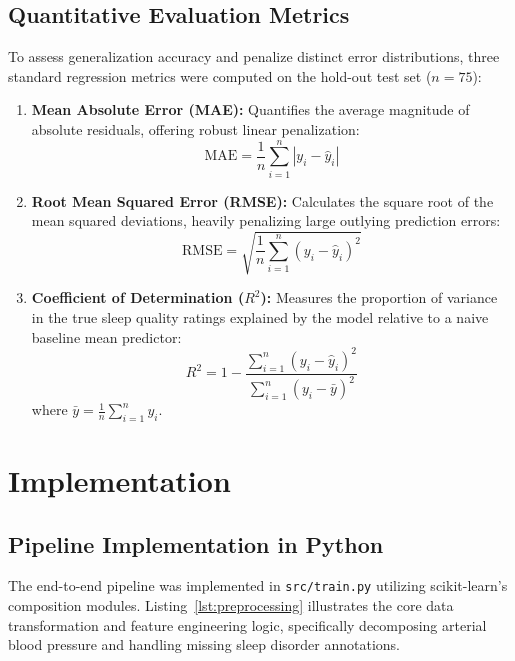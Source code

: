 \documentclass[12pt,a4paper]{article}
\begin{document}
\subsection{Quantitative Evaluation Metrics}
To assess generalization accuracy and penalize distinct error distributions, three standard regression metrics were computed on the hold-out test set ($n = 75$):
\begin{enumerate}
    \item \textbf{Mean Absolute Error (MAE):} Quantifies the average magnitude of absolute residuals, offering robust linear penalization:
    \begin{equation}
        \text{MAE} = \frac{1}{n} \sum_{i=1}^n \left| y_i - \hat{y}_i \right|
    \end{equation}
    \item \textbf{Root Mean Squared Error (RMSE):} Calculates the square root of the mean squared deviations, heavily penalizing large outlying prediction errors:
    \begin{equation}
        \text{RMSE} = \sqrt{\frac{1}{n} \sum_{i=1}^n \left( y_i - \hat{y}_i \right)^2}
    \end{equation}
    \item \textbf{Coefficient of Determination ($R^2$):} Measures the proportion of variance in the true sleep quality ratings explained by the model relative to a naive baseline mean predictor:
    \begin{equation}
        R^2 = 1 - \frac{\sum_{i=1}^n \left( y_i - \hat{y}_i \right)^2}{\sum_{i=1}^n \left( y_i - \bar{y} \right)^2}
    \end{equation}
    where $\bar{y} = \frac{1}{n} \sum_{i=1}^n y_i$.
\end{enumerate}

\section{Implementation}

\subsection{Pipeline Implementation in Python}
The end-to-end pipeline was implemented in \texttt{src/train.py} utilizing scikit-learn's composition modules. Listing~\ref{lst:preprocessing} illustrates the core data transformation and feature engineering logic, specifically decomposing arterial blood pressure and handling missing sleep disorder annotations.
\end{document}
